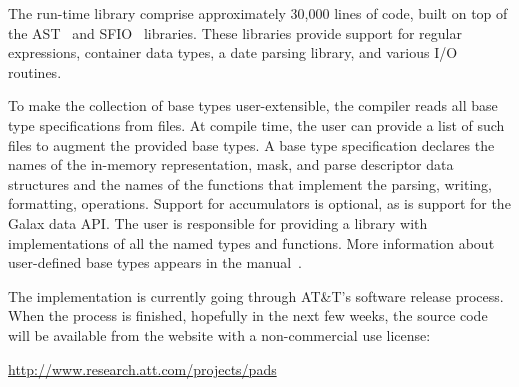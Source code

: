 \documentclass{sig-alternate}
\begin{document}
The \pads{} run-time library comprise approximately 30,000 lines of \C{} code, built on top of the AST~\cite{ast} and SFIO~\cite{sfio} libraries.
These libraries provide support for regular expressions, container data types, a date parsing library, and various I/O routines.  
 
To make the collection of base types user-extensible, the compiler reads all base type specifications from files.  
At compile time, the user can provide a list of such files to augment the provided base types.
A base type specification
declares the names of the in-memory representation, mask, and parse descriptor data structures and the names of the functions that implement the parsing, writing, formatting, \etc{} operations.  Support for accumulators is optional, as is support for the Galax data API.  The user is responsible for providing a \C{} library with implementations of all the named types and functions. 
More information about user-defined base types appears in the \pads{} manual~\cite{padsmanual}.

The \pads{} implementation is currently going through AT\&T's software
release process.  When the process is finished, hopefully in the next few weeks, the source code will be available from the \pads{} website with a non-commercial use license:
\begin{center}
\url{http://www.research.att.com/projects/pads}
\end{center}
 
\end{document}
